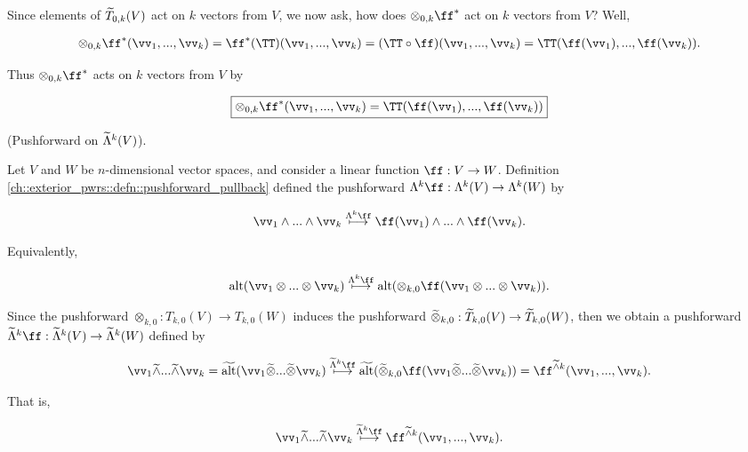 \begin{deriv}
    Since elements of $\widetilde{T}_{0,k}(V)$ act on $k$ vectors from $V$, we now ask, how does $\otimes_{0, k} \ff^*$ act on $k$ vectors from $V$? Well,
    
    \begin{align*}
        \otimes_{0, k} \ff^*(\vv_1, ..., \vv_k) = \ff^*(\TT)(\vv_1, ..., \vv_k) = (\TT \circ \ff)(\vv_1, ..., \vv_k) = \TT(\ff(\vv_1), ..., \ff(\vv_k)).
    \end{align*}
    
    Thus $\otimes_{0, k} \ff^*$ acts on $k$ vectors from $V$ by
    
    \begin{align*}
        \boxed
        {
            \otimes_{0, k} \ff^*(\vv_1, ..., \vv_k) = \TT(\ff(\vv_1), ..., \ff(\vv_k))
        }
    \end{align*}
\end{deriv}

\begin{deriv}
    (Pushforward on $\widetilde{\Lambda}^k(V)$).
    
    Let $V$ and $W$ be $n$-dimensional vector spaces, and consider a linear function $\ff:V \rightarrow W$. Definition \ref{ch::exterior_pwrs::defn::pushforward_pullback} defined the pushforward $\Lambda^k \ff:\Lambda^k(V) \rightarrow \Lambda^k(W)$ by
    
    \begin{align*}
        \vv_1 \wedge ... \wedge \vv_k \overset{\Lambda^k \ff}{\longmapsto} \ff(\vv_1) \wedge ... \wedge \ff(\vv_k).
    \end{align*}
    
    Equivalently,
    
    \begin{align*}
        \alt(\vv_1 \otimes ... \otimes \vv_k) \overset{\Lambda^k \ff}{\longmapsto} \alt(\otimes_{k, 0} \ff(\vv_1 \otimes ... \otimes 
        \vv_k)).
    \end{align*}
    
    Since the pushforward $\otimes_{k, 0}:T_{k,0}(V) \rightarrow T_{k,0}(W)$ induces the pushforward $\widetilde{\otimes}_{k,0}:\widetilde{T}_{k,0}(V) \rightarrow \widetilde{T}_{k,0}(W)$, then we obtain a pushforward $\tLambda^k \ff:\tLambda^k(V) \rightarrow \tLambda^k(W)$ defined by
    
    \begin{align*}
        \vv_1 \twedge ... \twedge \vv_k = \talt(\vv_1 \totimes ... \totimes \vv_k) \overset{\tLambda^k \ff}{\longmapsto} \talt(\totimes_{k,0} \ff(\vv_1 \totimes ... \totimes \vv_k)) = \ff^{\twedge k}(\vv_1, ..., \vv_k).
    \end{align*}
    
    That is,
    
    \begin{align*}
        \vv_1 \twedge ... \twedge \vv_k \overset{\tLambda^k \ff}{\longmapsto} \ff^{\twedge k}(\vv_1, ..., \vv_k).
    \end{align*}
\end{deriv}

